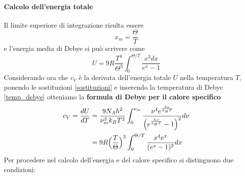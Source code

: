 \paragraph{Calcolo dell'energia totale}
Il limite superiore di integrazione risulta essere
$$x_m = \frac{\Theta}{T}$$
e l'energia media di Debye si può scrivere come
\begin{equation}
U = 9 R \frac{T^4}{\Theta^3} \int_0^{\Theta/T}  \frac{x^3 dx}{e^x-1}
\label{energia_tot_debye_3}
\end{equation}
Considerando ora che $c_V$ è la derivata dell'energia totale $U$ nella temperatura $T$, ponendo le sostituzioni \ref{sostituzioni} e inserendo la temperatura di Debye \ref{temp_debye} otteniamo la \textbf{formula di Debye per il calore specifico}
\begin{equation}
\begin{split}
c_V = \frac{dU}{dT} & = \frac{9 N_A h^2}{\nu_m^3 k_B T^2} \int_0^{\nu_m}\frac{\nu^4 e^{ \frac{h\nu}{k_BT} }}{\Bigl(  e^{ \frac{h\nu}{k_BT} }-1  \Bigr)^2} d\nu \\
& = 9 R \Bigl(  \frac{T }{\Theta}  \Bigr)^3 \int_0^{\Theta/T} \frac{x^4 e^x}{(e^x - 1)^2} dx
\end{split}
\end{equation}
Per procedere nel calcolo dell'energia e del calore specifico si distinguono due condizioni:

